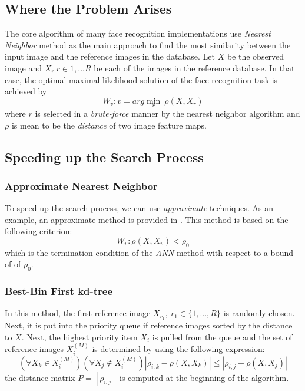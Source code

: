 \subsection{Where the Problem Arises}
The core algorithm of many face recognition implementations use \textit{Nearest Neighbor} method as the main approach to find the most similarity between the input image and the reference images in the database. Let $X$ be the observed image and $X_r \ r\in{1, ... R}$ be each of the images in the reference database. In that case, the optimal maximal likelihood solution of the face recognition task is achieved by
\begin{equation}
	W_v: v = arg\min\limits_{r}\ \rho(X, X_r)
\end{equation}
where $r$ is selected in a \textit{brute-force} manner by the nearest neighbor algorithm and $\rho$ is mean to be the \textit{distance} of two image feature maps.

\subsection{Speeding up the Search Process}
\subsubsection{Approximate Nearest Neighbor}
To speed-up the search process, we can use \textit{approximate} techniques. As an example, an approximate method is provided in \cite{def2}. This method is based on the following criterion:
\begin{equation}
	W_v: \rho(X, X_v) < \rho_0
\end{equation}
which is the termination condition of the \textit{ANN} method with respect to a bound of of $\rho_0$.

\subsubsection{Best-Bin First kd-tree}
In this method, the first reference image $X_{r_1},\ r_1 \in \{1, ... , R\}$ is randomly chosen. Next, it is put into the priority queue if reference images sorted by the distance to $X$. Next, the highest priority item $X_i$ is pulled from the queue and the set of reference images $X_i^{(M)}$ is determined by using the following expression:
\begin{equation}
	(\forall X_k \in X_i^{(M)})(\forall X_j \notin X_i^{(M)})|\rho_{i, k} - \rho(X, X_k)| \leq |\rho_{i, j} - \rho(X, X_j)|
\end{equation}
the distance matrix $P = [\rho_{i, j}]$ is computed at the beginning of the algorithm.


